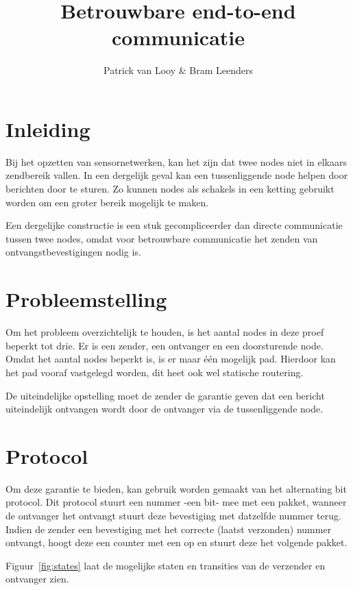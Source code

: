 \documentclass[a4paper,10pt]{article}
\title{Betrouwbare end-to-end communicatie}
\author{Patrick van Looy \& Bram Leenders}
\begin{document}
\maketitle

\section{Inleiding}
Bij het opzetten van sensornetwerken, kan het zijn dat twee nodes niet in elkaars zendbereik vallen. In een dergelijk geval kan een tussenliggende node helpen door berichten door te sturen. Zo kunnen nodes als schakels in een ketting gebruikt worden om een groter bereik mogelijk te maken.

Een dergelijke constructie is een stuk gecompliceerder dan directe communicatie tussen twee nodes, omdat voor betrouwbare communicatie het zenden van ontvangstbevestigingen nodig is.

\section{Probleemstelling}
Om het probleem overzichtelijk te houden, is het aantal nodes in deze proef beperkt tot drie. Er is een zender, een ontvanger en een doorsturende node. Omdat het aantal nodes beperkt is, is er maar \'e\'en mogelijk pad. Hierdoor kan het pad vooraf vastgelegd worden, dit heet ook wel statische routering.

De uiteindelijke opstelling moet de zender de garantie geven dat een bericht uiteindelijk ontvangen wordt door de ontvanger via de tussenliggende node. 

\section{Protocol}
Om deze garantie te bieden, kan gebruik worden gemaakt van het alternating bit protocol. Dit protocol stuurt een nummer -een bit- mee met een pakket, wanneer de ontvanger het ontvangt stuurt deze bevestiging met datzelfde nummer terug. Indien de zender een bevestiging met het correcte (laatst verzonden) nummer ontvangt, hoogt deze een counter met een op en stuurt deze het volgende pakket.

Figuur~\ref{fig:states} laat de mogelijke staten en transities van de verzender en ontvanger zien.
\end{document}
